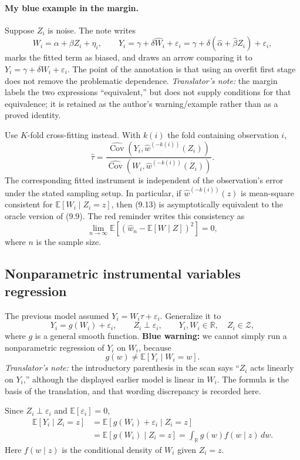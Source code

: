 \paragraph{My blue example in the margin.}
Suppose $Z_i$ is noise. The note writes
\[
 W_i=\alpha+\beta Z_i+\eta_i,
 \qquad Y_i=\gamma+\delta\widehat W_i+\varepsilon_i
 =\gamma+\delta(\widehat\alpha+\widehat\beta Z_i)+\varepsilon_i,
\]
marks the fitted term as biased, and draws an arrow comparing it to $Y_i=\gamma+\delta W_i+\varepsilon_i$. The point of the annotation is that using an overfit first stage does not remove the problematic dependence. \textit{Translator's note:} the margin labels the two expressions ``equivalent,'' but does not supply conditions for that equivalence; it is retained as the author's warning/example rather than as a proved identity.

Use $K$-fold cross-fitting instead. With $k(i)$ the fold containing observation $i$,
\[
 \widehat\tau=
 \frac{\widehat{\operatorname{Cov}}(Y_i,\widehat w^{(-k(i))}(Z_i))}
 {\widehat{\operatorname{Cov}}(W_i,\widehat w^{(-k(i))}(Z_i))}.\tag{9.13}
\]
The corresponding fitted instrument is independent of the observation's error under the stated sampling setup. In particular, if $\widehat w^{(-k(i))}(z)$ is mean-square consistent for $\mathbb E[W_i\mid Z_i=z]$, then (9.13) is asymptotically equivalent to the oracle version of (9.9). The red reminder writes this consistency as
\[
 \lim_{n\to\infty}\mathbb E[(\widehat w_n-\mathbb E[W\mid Z])^2]=0,
\]
where $n$ is the sample size.

\subsection{Nonparametric instrumental variables regression}
The previous model assumed $Y_i=W_i\tau+\varepsilon_i$. Generalize it to
\[
 Y_i=g(W_i)+\varepsilon_i,\qquad Z_i\perp\varepsilon_i,
 \qquad Y_i,W_i\in\mathbb R,\quad Z_i\in\mathcal Z,
\]
where $g$ is a general smooth function. \textbf{Blue warning:} we cannot simply run a nonparametric regression of $Y_i$ on $W_i$, because
\[
 g(w)\ne\mathbb E[Y_i\mid W_i=w].
\]
\textit{Translator's note:} the introductory parenthesis in the scan says ``$Z_i$ acts linearly on $Y_i$,'' although the displayed earlier model is linear in $W_i$. The formula is the basis of the translation, and that wording discrepancy is recorded here.

Since $Z_i\perp\varepsilon_i$ and $\mathbb E[\varepsilon_i]=0$,
\begin{align*}
 \mathbb E[Y_i\mid Z_i=z]
 &=\mathbb E[g(W_i)+\varepsilon_i\mid Z_i=z]\\
 &=\mathbb E[g(W_i)\mid Z_i=z]
 =\int_{\mathbb R}g(w)f(w\mid z)\,dw.\tag{9.15}
\end{align*}
Here $f(w\mid z)$ is the conditional density of $W_i$ given $Z_i=z$.

